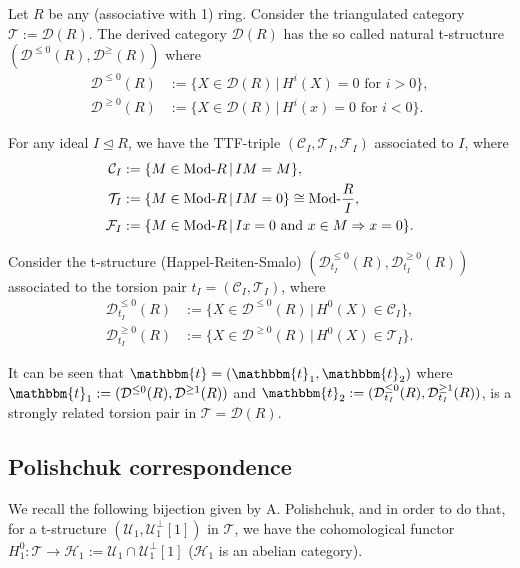 \begin{example}
  Let $R$ be any (associative with 1) ring. Consider the triangulated category $\mathcal{T}:=\mathcal{D}(R)$.
  The derived category $\mathcal{D}(R)$ has the so called natural t-structure
  $(\mathcal{D}^{\leq 0}(R),\mathcal{D}^{\geq}(R))$ where
  \begin{align*}
    \mathcal{D}^{\leq 0}(R) &:= \{ X\in\mathcal{D}(R) \,|\,H^i(X)=0\text{ for } i>0\},\\
    \mathcal{D}^{\geq 0}(R) &:= \{ X\in\mathcal{D}(R) \,|\,H^i(x)=0\text{ for } i<0\}.
  \end{align*}

  For any ideal $I\trianglelefteq R$, we have the TTF-triple $(\mathcal{C}_I,\mathcal{T}_I,\mathcal{F}_I)$
  associated to $I$, where
  \begin{align*}
    \mathcal{C}_I &:= \{M\in\mathrm{\textup{Mod-}}R\,|\,IM=M\},\\
    \mathcal{T}_I &:= \{M\in\mathrm{\textup{Mod-}}R\,|\,IM=0\}\cong \mathrm{\textup{Mod-}}\frac{R}{I},\\
    \mathcal{F}_I &:= \{M\in\mathrm{\textup{Mod-}}R\,|\,Ix=0\text{ and }x\in M\Rightarrow x=0\}.
  \end{align*}

  Consider the t-structure (Happel-Reiten-Smalo) $(\mathcal{D}^{\leq 0}_{t_I}(R), \mathcal{D}^{\geq 0}_{t_I}(R))$
  associated to the torsion pair $t_I=(\mathcal{C}_I,\mathcal{T}_I)$, where
  \begin{align*}
    \mathcal{D}^{\leq 0}_{t_I}(R) &:= \{ X\in\mathcal{D}^{\leq 0}(R)\,|\, H^0(X)\in\mathcal{C}_I \},\\
    \mathcal{D}^{\geq 0}_{t_I}(R) &:= \{ X\in\mathcal{D}^{\geq 0}(R)\,|\, H^0(X)\in\mathcal{T}_I \}.
  \end{align*}

  It can be seen that $\mathbbm{t}=(\mathbbm{t}_1,\mathbbm{t}_2)$ where
  $\mathbbm{t}_1:=(\mathcal{D}^{\leq 0}(R),\mathcal{D}^{\geq 1}(R))$ and
  $\mathbbm{t}_2:=(\mathcal{D}^{\leq 0}_{t_I}(R),\mathcal{D}^{\geq 1}_{t_I}(R))$, is a strongly
  related torsion pair in $\mathcal{T}=\mathcal{D}(R)$.
\end{example}

\subsection{Polishchuk correspondence}

We recall the following bijection given by A. Polishchuk, and in order to do that,
for a t-structure $(\mathcal{U}_1,\mathcal{U}_1^\perp[1])$ in $\mathcal{T}$, we have the cohomological
functor $H^0_1:\mathcal{T}\to \mathcal{H}_1:=\mathcal{U}_1\cap\mathcal{U}_1^\perp[1]$
($\mathcal{H}_1$ is an abelian category).

